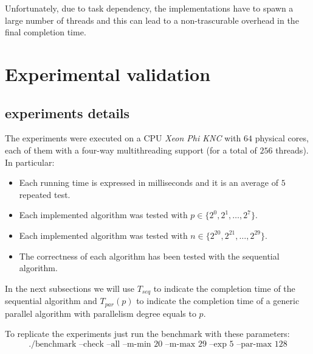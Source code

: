 \documentclass{article}
\begin{document}
\smallskip

Unfortunately, due to task dependency, the implementations have to spawn a large number of threads and this can lead to a non-trascurable overhead in the final completion time.

\section{Experimental validation}

\subsection{experiments details}

The experiments were executed on a CPU \textit{Xeon Phi KNC} with $64$ physical cores, each of them with a four-way multithreading support (for a total of $256$ threads). In particular:

\begin{itemize}
  \item Each running time is expressed in milliseconds and it is an average of $5$ repeated test.
  \item Each implemented algorithm was tested with $p \in \{2^0, 2^1, \ldots, 2^7\}$.
  \item Each implemented algorithm was tested with $n \in \{2^{20}, 2^{21}, \ldots, 2^{29}\}$.
  \item The correctness of each algorithm has been tested with the sequential algorithm.
\end{itemize}
  
In the next subsections we will use $T_{seq}$ to indicate the completion time of the sequential algorithm and  $T_{par}(p)$ to indicate the completion time of a generic parallel algorithm with parallelism degree equals to $p$.

\smallskip

To replicate the experiments just run the benchmark with these parameters:
\begin{equation*}
  \text{./benchmark --check --all --m-min 20 --m-max 29 --exp 5 --par-max 128}
\end{equation*}
\end{document}
